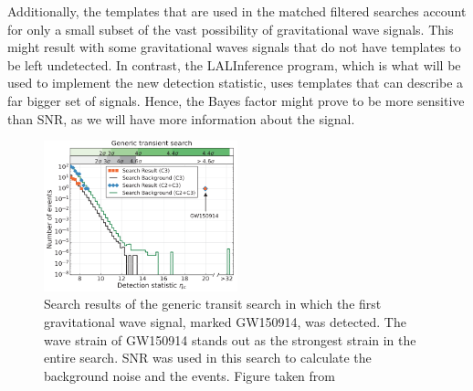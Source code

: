 \documentclass{article}
\begin{document}
  
  Additionally, the templates that are used in the matched filtered searches account for only a small subset of the vast possibility of gravitational wave signals. This might result with some gravitational waves signals that do not have templates to be left undetected.  In contrast, the LALInference program, which is what will be used to implement the new detection statistic, uses templates that can describe a far bigger set of signals. Hence, the Bayes factor might prove to be more sensitive than SNR, as we will have more information about the signal.
  
  
  
\begin{figure}[h]
	\centering
	\includegraphics[width=0.5\textwidth]{Figures/DetectionInGenericTransientSearch}
	\caption{Search results of the generic transit search in which the first gravitational wave signal, marked GW150914, was detected. The wave strain of GW150914 stands out as the strongest strain in the entire search. SNR was used in this search to calculate the background noise and the events. Figure taken from \cite{DetectionPaper}}
	 \label{Fig:Detection}
\end{figure}

 
 
  
  

 
 
 
\end{document}
